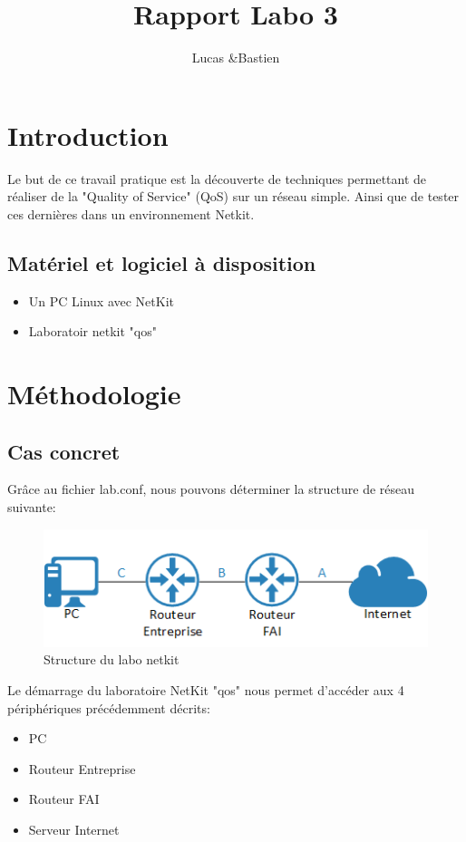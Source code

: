 \documentclass{article}
\title{Rapport Labo 3}
\author{Lucas \bsc{Bulloni} \&Bastien \bsc{Wermeille}}
\begin{document}
\maketitle

 

\section{Introduction}
Le but de ce travail pratique est la découverte de techniques permettant de réaliser de la "Quality of Service" (QoS) sur un réseau simple. Ainsi que de tester ces dernières dans un environnement Netkit.

\subsection{Matériel et logiciel à disposition}
\begin{itemize}
	\item Un PC Linux avec NetKit
	\item Laboratoir netkit "qos"
\end{itemize}

\section{Méthodologie}

\subsection{Cas concret}
Grâce au fichier lab.conf, nous pouvons déterminer la structure de réseau suivante:
\begin{figure}[h]
  \centering
  \includegraphics{./Structure.png}
  \caption{Structure du labo netkit}
  \label{fig:structure}
\end{figure}

Le démarrage du laboratoire NetKit "qos" nous permet d'accéder aux 4 périphériques précédemment décrits:
\begin{itemize}
	\item PC
	\item Routeur Entreprise
	\item Routeur FAI
	\item Serveur Internet
\end{itemize}
\end{document}
